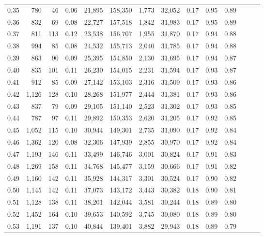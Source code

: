 \begin{tabular}{rrrrrrrrrrrrrr}
0.35 &    780 &     46 &  0.06 &   21,895 &  158,350 &   1,773 &  32,052 &  0.17 &  0.95 &      0.89 \\
0.36 &    832 &     69 &  0.08 &   22,727 &  157,518 &   1,842 &  31,983 &  0.17 &  0.95 &      0.89 \\
0.37 &    811 &    113 &  0.12 &   23,538 &  156,707 &   1,955 &  31,870 &  0.17 &  0.94 &      0.88 \\
0.38 &    994 &     85 &  0.08 &   24,532 &  155,713 &   2,040 &  31,785 &  0.17 &  0.94 &      0.88 \\
0.39 &    863 &     90 &  0.09 &   25,395 &  154,850 &   2,130 &  31,695 &  0.17 &  0.94 &      0.87 \\
0.40 &    835 &    101 &  0.11 &   26,230 &  154,015 &   2,231 &  31,594 &  0.17 &  0.93 &      0.87 \\
0.41 &    912 &     85 &  0.09 &   27,142 &  153,103 &   2,316 &  31,509 &  0.17 &  0.93 &      0.86 \\
0.42 &  1,126 &    128 &  0.10 &   28,268 &  151,977 &   2,444 &  31,381 &  0.17 &  0.93 &      0.86 \\
0.43 &    837 &     79 &  0.09 &   29,105 &  151,140 &   2,523 &  31,302 &  0.17 &  0.93 &      0.85 \\
0.44 &    787 &     97 &  0.11 &   29,892 &  150,353 &   2,620 &  31,205 &  0.17 &  0.92 &      0.85 \\
0.45 &  1,052 &    115 &  0.10 &   30,944 &  149,301 &   2,735 &  31,090 &  0.17 &  0.92 &      0.84 \\
0.46 &  1,362 &    120 &  0.08 &   32,306 &  147,939 &   2,855 &  30,970 &  0.17 &  0.92 &      0.84 \\
0.47 &  1,193 &    146 &  0.11 &   33,499 &  146,746 &   3,001 &  30,824 &  0.17 &  0.91 &      0.83 \\
0.48 &  1,269 &    158 &  0.11 &   34,768 &  145,477 &   3,159 &  30,666 &  0.17 &  0.91 &      0.82 \\
0.49 &  1,160 &    142 &  0.11 &   35,928 &  144,317 &   3,301 &  30,524 &  0.17 &  0.90 &      0.82 \\
0.50 &  1,145 &    142 &  0.11 &   37,073 &  143,172 &   3,443 &  30,382 &  0.18 &  0.90 &      0.81 \\
0.51 &  1,128 &    138 &  0.11 &   38,201 &  142,044 &   3,581 &  30,244 &  0.18 &  0.89 &      0.80 \\
0.52 &  1,452 &    164 &  0.10 &   39,653 &  140,592 &   3,745 &  30,080 &  0.18 &  0.89 &      0.80 \\
0.53 &  1,191 &    137 &  0.10 &   40,844 &  139,401 &   3,882 &  29,943 &  0.18 &  0.89 &      0.79 \\

\end{tabular}
